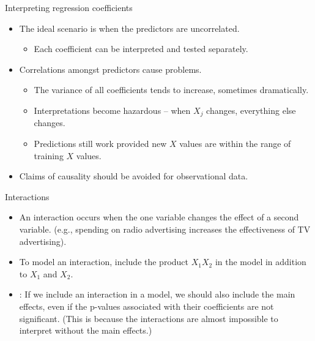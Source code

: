 \documentclass[14pt]{beamer}
\begin{document}
\begin{frame}{\large Interpreting regression coefficients}

\begin{itemize}
\item The ideal scenario is when the predictors are uncorrelated.
\begin{itemize}
\item Each coefficient can be interpreted and tested separately.
\end{itemize}
\item Correlations amongst predictors cause problems.
\begin{itemize}
\item The variance of all coefficients tends to increase, sometimes dramatically.
\item Interpretations become hazardous -- when $X_j$ changes, everything else changes.
\item Predictions still work provided new $X$ values are within the range of training $X$ values.
\end{itemize}
\item Claims of causality should be avoided for observational data.
\end{itemize}

\end{frame}

\begin{frame}{Interactions}
\begin{itemize}
\item An interaction occurs when the one variable changes the effect of a second variable. (e.g., spending on radio advertising increases the effectiveness of TV advertising).

\item To model an interaction, include the product $X_1X_2$ in the model in addition to $X_1$ and $X_2$.

\item {}: If we include an interaction in a model, we should also include the main effects, even if the p-values associated
with their coefficients are not significant. (This is because the interactions are almost impossible to interpret without the main effects.)
\end{itemize}

\end{frame}
\end{document}
